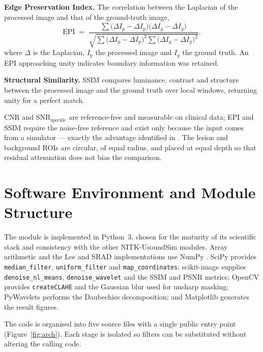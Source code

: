 \documentclass[12pt,a4paper,oneside]{report}
\begin{document}
\textbf{Edge Preservation Index.} The correlation between the Laplacian of the
processed image and that of the ground-truth image,
\begin{equation}
\mathrm{EPI} \;=\;
\frac{\sum \bigl(\Delta I_p - \overline{\Delta I_p}\bigr)
            \bigl(\Delta I_g - \overline{\Delta I_g}\bigr)}
     {\sqrt{\sum\bigl(\Delta I_p-\overline{\Delta I_p}\bigr)^{2}
            \sum\bigl(\Delta I_g-\overline{\Delta I_g}\bigr)^{2}}} ,
\label{eq:epi}
\end{equation}
where $\Delta$ is the Laplacian, $I_p$ the processed image and $I_g$ the ground
truth. An EPI approaching unity indicates boundary information was retained.

\textbf{Structural Similarity.} SSIM \cite{wang2004ssim} compares luminance,
contrast and structure between the processed image and the ground truth over local
windows, returning unity for a perfect match.

CNR and $\mathrm{SNR}_{\text{speckle}}$ are reference-free and measurable on
clinical data; EPI and SSIM require the noise-free reference and exist only because
the input comes from a simulator --- exactly the advantage identified in
\cite{abadi2020vct}. The lesion and background ROIs are circular, of equal radius,
and placed at equal depth so that residual attenuation does not bias the
comparison.



\section{Software Environment and Module Structure}
\label{ch:implementation}

The module is implemented in Python~3, chosen for the maturity of its scientific
stack and consistency with the other NITK-UsoundSim modules. Array arithmetic and
the Lee and SRAD implementations use NumPy \cite{harris2020numpy}. SciPy provides
\texttt{median\_filter}, \texttt{uniform\_filter} and \texttt{map\_coordinates};
scikit-image \cite{vanderwalt2014skimage} supplies \texttt{denoise\_nl\_means},
\texttt{denoise\_wavelet} and the SSIM and PSNR metrics; OpenCV provides
\texttt{createCLAHE} and the Gaussian blur used for unsharp masking; PyWavelets
performs the Daubechies decomposition; and Matplotlib generates the result
figures.


The code is organised into five source files with a single public entry point
(Figure~\ref{fig:arch}). Each stage is isolated so filters can be substituted
without altering the calling code.
\end{document}
